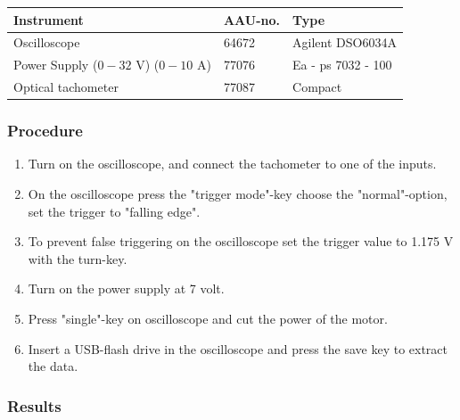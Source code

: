 \begin{table}[H]
\begin{tabular}{|l|l|p{4cm}|}
\hline%
  \textbf{Instrument}                        &  \textbf{AAU-no.}  &  \textbf{Type}       \\
\hline%
  Oscilloscope                               &  64672             &  Agilent DSO6034A    \\
\hline%
  Power Supply ($0 - 32$ V) ($0 - 10$ A)     &  77076             &  Ea - ps 7032 - 100  \\
\hline%
  Optical tachometer                         &  77087             &  Compact             \\
\hline%
\end{tabular}
\end{table}

\subsubsection{Procedure}

\begin{enumerate}
  \item Turn on the oscilloscope, and connect the tachometer to one of the inputs.
  \item On the oscilloscope press the "trigger mode"-key choose the "normal"-option, set the trigger to "falling edge".
  \item To prevent false triggering on the oscilloscope set the trigger value to \num{1,175} V with the turn-key.
  \item Turn on the power supply at 7 volt.
  \item Press "single"-key on oscilloscope and cut the power of the motor.
  \item Insert a USB-flash drive in the oscilloscope and press the save key to extract the data.
\end{enumerate}

\subsubsection{Results}

